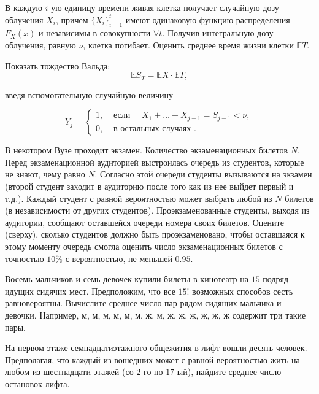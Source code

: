 \begin{problem}
В каждую $i$-ую единицу времени живая клетка получает случайную дозу облучения $X_i$, причем $\{ X_i\}_{i=1}^{t}$ имеют 
одинаковую функцию распределения $F_X(x)$ и независимы в совокупности $\forall t$. Получив интегральную дозу облучения, 
равную $\nu$, клетка погибает. Оценить среднее время жизни клетки ${\mathbb E}T$. 
\end{problem}

\begin{ordre}

Показать тождество Вальда: 
$$
{\mathbb E}S_T={\mathbb E}X\cdot {\mathbb E}T, 
$$

введя вспомогательную случайную величину

$$
Y_j=\begin{cases}
1, &\text{ если }\quad X_1+\ldots +X_{j-1}=S_{j-1}<\nu, \\
0, &\text{ в остальных случаях }. 
\end{cases}
$$
 

\end{ordre}

\begin{problem}
В некотором Вузе проходит экзамен. Количество экзаменационных билетов $N$. Перед экзаменационной аудиторией выстроилась очередь из 
студентов, которые не знают, чему равно $N$. Согласно этой очереди студенты вызываются на экзамен (второй студент заходит в аудиторию 
после того как из нее выйдет первый и т.д.). Каждый студент с равной вероятностью может выбрать любой из $N$ билетов (в независимости 
от других студентов). Проэкзаменованные студенты, выходя из аудитории, сообщают оставшейся очереди номера своих билетов. 
Оцените (сверху), сколько студентов должно быть проэкзаменовано, чтобы оставшаяся к этому моменту очередь смогла оценить число 
экзаменационных билетов с точностью $10\%$ с вероятностью, не меньшей $0.95$. 
\end{problem}


\begin{problem}
Восемь мальчиков и семь девочек купили билеты в кинотеатр на $15$ подряд идущих сидячих мест. Предположим, что все $15!$ 
возможных способов сесть равновероятны. Вычислите среднее число пар рядом сидящих мальчика и девочки. Например, 
м, м, м, м, м, м, ж, м, ж, ж, ж, ж, ж, ж содержит три такие пары. 
\end{problem}


\begin{problem}
На первом этаже семнадцатиэтажного общежития в лифт вошли десять человек. Предполагая, что каждый из вошедших может с равной вероятностью 
жить на любом из шестнадцати этажей (со $2$-го по $17$-ый), найдите среднее число остановок лифта. 
\end{problem}



